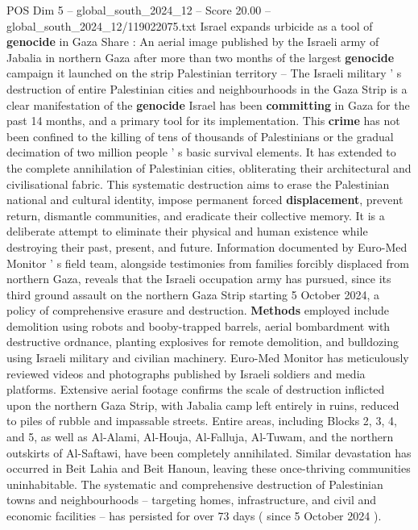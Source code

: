 \begin{textsample}{POS Dim 5 – global\_south\_2024\_12 – Score 20.00 – global\_south\_2024\_12/119022075.txt}  \label{ex:f5_pos_043}
Israel expands urbicide as a tool of \textbf{genocide} in Gaza Share : An aerial image published by the Israeli army of Jabalia in northern Gaza after more than two months of the largest \textbf{genocide} campaign it launched on the strip Palestinian territory -- The Israeli military ' s destruction of entire Palestinian cities and neighbourhoods in the Gaza Strip is a clear manifestation of the \textbf{genocide} Israel has been \textbf{committing} in Gaza for the past 14 months, and a primary tool for its implementation.
This \textbf{crime} has not been confined to the killing of tens of thousands of Palestinians or the gradual decimation of two million people ' s basic survival elements.
It has extended to the complete annihilation of Palestinian cities, obliterating their architectural and civilisational fabric.
This systematic destruction aims to erase the Palestinian national and cultural identity, impose permanent forced \textbf{displacement}, prevent return, dismantle communities, and eradicate their collective memory.
It is a deliberate attempt to eliminate their physical and human existence while destroying their past, present, and future.
Information documented by Euro-Med Monitor ' s field team, alongside testimonies from families forcibly displaced from northern Gaza, reveals that the Israeli occupation army has pursued, since its third ground assault on the northern Gaza Strip starting 5 October 2024, a policy of comprehensive erasure and destruction. \textbf{Methods} employed include demolition using robots and booby-trapped barrels, aerial bombardment with destructive ordnance, planting explosives for remote demolition, and bulldozing using Israeli military and civilian machinery.
Euro-Med Monitor has meticulously reviewed videos and photographs published by Israeli soldiers and media platforms.
Extensive aerial footage confirms the scale of destruction inflicted upon the northern Gaza Strip, with Jabalia camp left entirely in ruins, reduced to piles of rubble and impassable streets.
Entire areas, including Blocks 2, 3, 4, and 5, as well as Al-Alami, Al-Houja, Al-Falluja, Al-Tuwam, and the northern outskirts of Al-Saftawi, have been completely annihilated.
Similar devastation has occurred in Beit Lahia and Beit Hanoun, leaving these once-thriving communities uninhabitable.
The systematic and comprehensive destruction of Palestinian towns and neighbourhoods -- targeting homes, infrastructure, and civil and economic facilities -- has persisted for over 73 days ( since 5 October 2024 ).

\end{textsample}

